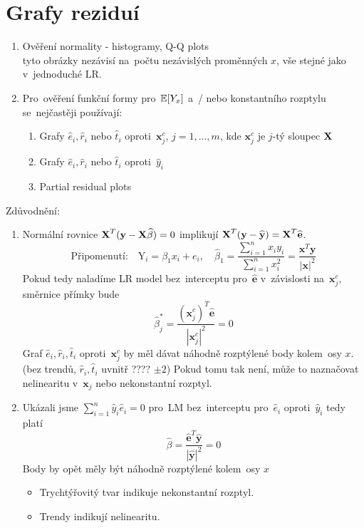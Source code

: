 \section{Grafy reziduí}
\begin{enumerate}
\item Ověření normality - histogramy, Q-Q plots \\
tyto obrázky nezávisí na~počtu nezávislých proměnných $x$, vše stejné jako v~jednoduché LR.
\item Pro~ověření funkční formy pro~$\mathbb{E} [Y_x]$ a~/ nebo konstantního rozptylu se~nejčastěji používají:
\begin{enumerate}
\item Grafy $\widehat{e}_i, \widehat{r}_i$ nebo $\widehat{t}_i$ oproti~$\textbf{x}_j^c$, $j = 1,..., m$, kde $\textbf{x}_j^c$ je $j$-tý sloupec $\textbf{X}$
\item  Grafy $\widehat{e}_i, \widehat{r}_i$ nebo $\widehat{t}_i$ oproti~$\widehat{y}_i$
\item Partial residual plots
\end{enumerate}
\end{enumerate}

\begin{remark}
Zdůvodnění:
\begin{enumerate}
\item Normální rovnice $\textbf{X}^T (\textbf{y} - \textbf{X} \widehat{\beta}) = 0$ implikují $\textbf{X}^T (\textbf{y} - \widehat{\textbf{y}}) = \textbf{X}^T \widehat{\textbf{e}}$.
 $$
 \text{Připomenutí:} \quad \text{Y}_i = \beta_1 x_i + e_i, \quad \widehat{\beta}_1 = \frac{\sum_{i = 1}^n x_i y_i}{\sum_{i = 1}^n x_i^2} = \frac{\textbf{x}^T\textbf{y}}{| \textbf{x} |^2 }
 $$
Pokud tedy naladíme LR model bez~interceptu pro~$\widehat{\textbf{e}}$ v~závislosti na~$\textbf{x}_j^c$, směrnice přímky bude
 $$
  \widehat{\beta}_j^* = \frac{(\textbf{x}_j^c)^T \widehat{\textbf{e}}}{| \textbf{x}_j^c |^2} = 0
 $$
Graf $\widehat{e}_i, \widehat{r}_i, \widehat{t}_i$ oproti~$\textbf{x}_j^c$ by měl dávat náhodně rozptýlené body kolem~osy $x$. (bez trendů, $\widehat{r}_i, \widehat{t}_i$ uvnitř ???? $\pm 2$)
Pokud tomu tak není, může to naznačovat nelinearitu v~$\textbf{x}_j$ nebo nekonstantní rozptyl.
\item Ukázali jsme $\sum_{i = 1}^n \widehat{y}_i \widehat{e}_i = 0$ pro~LM bez~interceptu pro~$\widehat{e}_i$ oproti~$\widehat{y}_i$ tedy platí
 $$
  \widehat{\beta} = \frac{\widehat{\textbf{e}}^T \widehat{\textbf{y}}}{| \widehat{\textbf{y}} |^2} = 0
 $$
Body by opět měly být náhodně rozptýlené kolem~osy $x$
\begin{itemize}
\item Trychtýřovitý tvar indikuje nekonstantní rozptyl.
\item Trendy indikují nelinearitu.
\end{itemize}
\end{enumerate}	
\end{remark}

